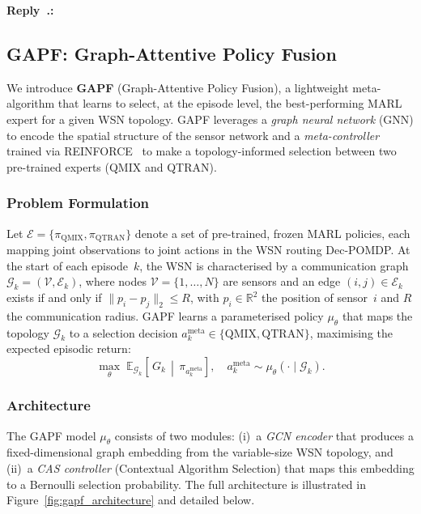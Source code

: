 \documentclass[11pt]{article}
\newcounter{reviewer}
\newcounter{replyctr}[reviewer]
\renewcommand{\thereplyctr}{\thereviewer.\arabic{replyctr}}
\newenvironment{reply}
  {\refstepcounter{replyctr}%
   \addtocounter{replyctr}{-1}%
   \medskip\noindent
   \begin{sf}\textbf{Reply~\thereplyctr:}\ }
  {\addtocounter{replyctr}{1}%
   \medskip\end{sf}}
\begin{document}
\begin{refsection}
\begin{mdframed}[style=Resp]
\begin{reply}
\subsection{GAPF: Graph-Attentive Policy Fusion}
\label{sec:gapf}

We introduce \textbf{GAPF} (Graph-Attentive Policy Fusion), a lightweight meta-algorithm that learns to select, at the episode level, the best-performing MARL expert for a given WSN topology. GAPF leverages a \emph{graph neural network} (GNN) to encode the spatial structure of the sensor network and a \emph{meta-controller} trained via REINFORCE~\cite{williams1992simple} to make a topology-informed selection between two pre-trained experts (QMIX and QTRAN).

\subsubsection{Problem Formulation}
\label{sec:gapf_formulation}

Let $\mathcal{E} = \{\pi_{\text{QMIX}}, \pi_{\text{QTRAN}}\}$ denote a set of pre-trained, frozen MARL policies, each mapping joint observations to joint actions in the WSN routing Dec-POMDP. At the start of each episode~$k$, the WSN is characterised by a communication graph $\mathcal{G}_k = (\mathcal{V}, \mathcal{E}_k)$, where nodes $\mathcal{V} = \{1, \dots, N\}$ are sensors and an edge $(i,j) \in \mathcal{E}_k$ exists if and only if $\|p_i - p_j\|_2 \leq R$, with $p_i \in \mathbb{R}^2$ the position of sensor~$i$ and $R$ the communication radius. GAPF learns a parameterised policy $\mu_\theta$ that maps the topology $\mathcal{G}_k$ to a selection decision $a^{\text{meta}}_k \in \{\text{QMIX}, \text{QTRAN}\}$, maximising the expected episodic return:
\begin{equation}
    \max_\theta \; \mathbb{E}_{\mathcal{G}_k}\!\left[\, G_k \,\middle|\, \pi_{a^{\text{meta}}_k}\right], \quad a^{\text{meta}}_k \sim \mu_\theta(\cdot \mid \mathcal{G}_k).
    \label{eq:gapf_objective}
\end{equation}

\subsubsection{Architecture}
\label{sec:gapf_architecture}

The GAPF model $\mu_\theta$ consists of two modules: (i)~a \emph{GCN encoder} that produces a fixed-dimensional graph embedding from the variable-size WSN topology, and (ii)~a \emph{CAS controller} (Contextual Algorithm Selection) that maps this embedding to a Bernoulli selection probability. The full architecture is illustrated in Figure~\ref{fig:gapf_architecture} and detailed below.


\end{reply}
\end{mdframed}
\end{refsection}
\end{document}
